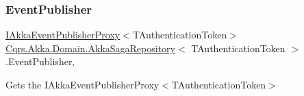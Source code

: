 \subsubsection{\texorpdfstring{Event\+Publisher}{EventPublisher}}
{\footnotesize\ttfamily \hyperlink{interfaceCqrs_1_1Akka_1_1Events_1_1IAkkaEventPublisherProxy}{I\+Akka\+Event\+Publisher\+Proxy}$<$T\+Authentication\+Token$>$ \hyperlink{classCqrs_1_1Akka_1_1Domain_1_1AkkaSagaRepository}{Cqrs.\+Akka.\+Domain.\+Akka\+Saga\+Repository}$<$ T\+Authentication\+Token $>$.Event\+Publisher\hspace{0.3cm}{\ttfamily [get]}, {\ttfamily [protected]}}



Gets the I\+Akka\+Event\+Publisher\+Proxy$<$\+T\+Authentication\+Token$>$ 

